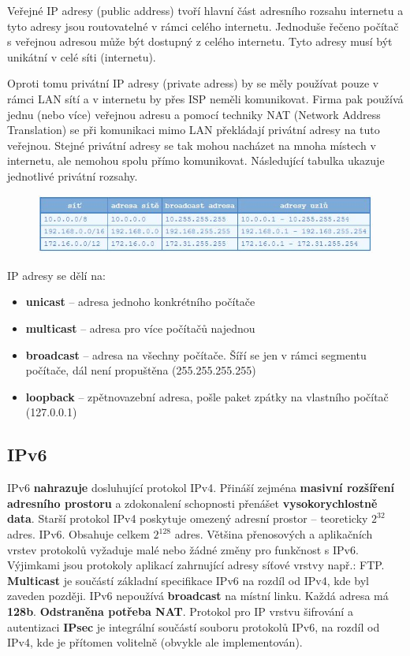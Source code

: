 Veřejné IP adresy (public address) tvoří hlavní část adresního rozsahu internetu a tyto adresy jsou routovatelné v rámci celého internetu. Jednoduše řečeno počítač s veřejnou adresou může být dostupný z celého internetu. Tyto adresy musí být unikátní v celé síti (internetu).

Oproti tomu privátní IP adresy (private adress) by se měly používat pouze v rámci LAN sítí a v internetu by přes ISP neměli komunikovat. Firma pak používá jednu (nebo více) veřejnou adresu a pomocí techniky NAT (Network Address Translation) se při komunikaci mimo LAN překládají privátní adresy na tuto veřejnou. Stejné privátní adresy se tak mohou nacházet na mnoha místech v internetu, ale nemohou spolu přímo komunikovat. Následující tabulka ukazuje jednotlivé privátní rozsahy.
\begin{figure}[H]
\centering
\includegraphics[width=1\textwidth]{assets/6_ip4}
\end{figure}

IP adresy se dělí na:
\begin{itemize}
\item \textbf{unicast} -- adresa jednoho konkrétního počítače
\item \textbf{multicast} -- adresa pro více počítačů najednou
\item \textbf{broadcast} -- adresa na všechny počítače. Šíří se jen v rámci segmentu počítače, dál není propuštěna (255.255.255.255)
\item \textbf{loopback} -- zpětnovazební adresa, pošle paket zpátky na vlastního počítač (127.0.0.1)
\end{itemize}

\subsection{IPv6}
IPv6 \textbf{nahrazuje} dosluhující protokol IPv4. Přináší zejména \textbf{masivní rozšíření adresního prostoru} a zdokonalení schopnosti přenášet \textbf{vysokorychlostně data}. Starší protokol IPv4 poskytuje omezený adresní prostor – teoreticky $2^{32}$ adres. IPv6. Obsahuje celkem $2^{128}$ adres. Většina přenosových a aplikačních vrstev protokolů vyžaduje malé nebo žádné změny pro funkčnost s IPv6. Výjimkami jsou protokoly aplikací zahrnující adresy síťové vrstvy např.: FTP. \textbf{Multicast} je součástí základní specifikace IPv6 na rozdíl od IPv4, kde byl zaveden později. IPv6 nepoužívá \textbf{broadcast} na místní linku. Každá adresa má \textbf{128b}. \textbf{Odstraněna potřeba NAT}. Protokol pro IP vrstvu šifrování a autentizaci \textbf{IPsec} je integrální součástí souboru protokolů IPv6, na rozdíl od IPv4, kde je přítomen volitelně (obvykle ale implementován).

